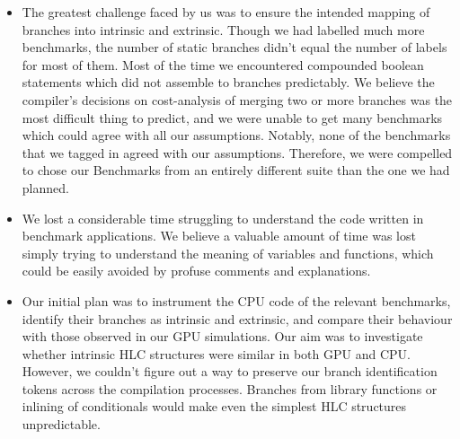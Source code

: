 %
%
\label{sec:challenges}

\begin{itemize}
Throughout the course of this project, we faced several difficulties which 
shaped the course of our work:
\item The greatest challenge faced by us was to ensure the intended mapping
of branches into intrinsic and extrinsic. Though we had labelled much more 
benchmarks, the number of static branches didn't equal the number of labels for most of them.
Most of the time we encountered compounded boolean statements which did not assemble to branches
predictably. We believe the compiler's decisions on cost-analysis of merging two or more branches
was the most difficult thing to predict, and we were unable to get many benchmarks which could
agree with all our assumptions. Notably, none of the benchmarks that we tagged in \cite{parboil-benchmark-suite}
agreed with our assumptions. Therefore, we were compelled to chose our Benchmarks from
an entirely different suite than the one we had planned.
\item We lost a considerable time struggling to understand the code written in benchmark applications. 
We believe a valuable amount of time was lost simply trying
to understand the meaning of variables and functions, which could be easily avoided 
by profuse comments and explanations.
\item Our initial plan was to instrument the CPU code of the relevant benchmarks, identify
their branches as intrinsic and extrinsic, and compare their behaviour with those observed
in our GPU simulations. Our aim was to investigate whether intrinsic HLC structures were similar
in both GPU and CPU. However, we couldn't figure out a way to preserve our branch identification tokens
across the compilation processes. Branches from library functions or inlining of conditionals
would make even the simplest HLC structures unpredictable.

\end{itemize}

